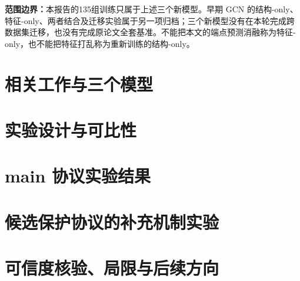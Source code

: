 \documentclass[UTF8,a4paper,11pt,fontset=fandol]{ctexart}
\begin{document}
\textbf{范围边界：}本报告的135组训练只属于上述三个新模型。早期 GCN 的结构-only、特征-only、两者结合及迁移实验属于另一项归档；三个新模型没有在本轮完成跨数据集迁移，也没有完成原论文全套基准。不能把本文的端点预测消融称为特征-only，也不能把特征打乱称为重新训练的结构-only。

\section{相关工作与三个模型}

\clearpage
\section{实验设计与可比性}

\clearpage
\begin{landscape}
\section{main 协议实验结果}

\clearpage
\begin{landscape}
\section{候选保护协议的补充机制实验}

\clearpage
\section{可信度核验、局限与后续方向}

\clearpage

\clearpage\appendix

\end{landscape}
\end{landscape}
\end{document}
